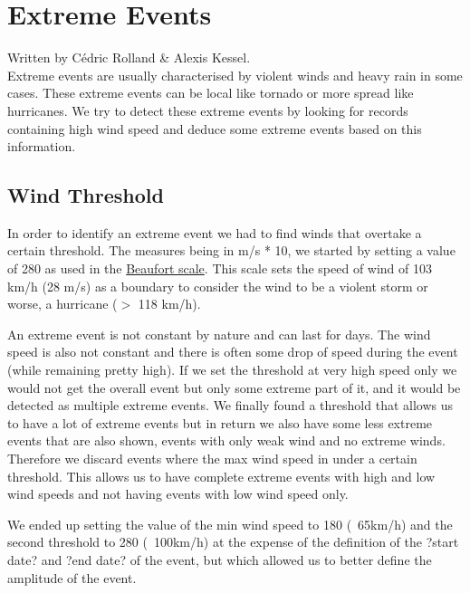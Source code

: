 \section{Extreme Events}
Written by Cédric Rolland \& Alexis Kessel.\\

Extreme events are usually characterised by violent winds and heavy rain in some cases. These extreme events can be local like tornado or more spread like hurricanes. We try to detect these extreme events by looking for records containing high wind speed and deduce some extreme events based on this information.

\subsection{Wind Threshold}
In order to identify an extreme event we had to find winds that overtake a certain threshold. The measures being in m/s * 10, we started by setting a value of 280 as used in the \href{http://en.wikipedia.org/wiki/Beaufort_scale}{Beaufort scale}. This scale sets the speed of wind of 103 km/h (28 m/s) as a boundary to consider the wind to be a violent storm or worse, a hurricane ($>$ 118 km/h).

An extreme event is not constant by nature and can last for days. The wind speed is also not constant and there is often some drop of speed during the event (while remaining pretty high). If we set the threshold at very high speed only we would not get the overall event but only some extreme part of it, and it would be detected as multiple extreme events. We finally found a threshold that allows us to have a lot of extreme events but in return we also have some less extreme events that are also shown, events with only weak wind and no extreme winds. Therefore we discard events where the max wind speed in under a certain threshold. This allows us to have complete extreme events with high and low wind speeds and not having events with low wind speed only.

We ended up setting the value of the min wind speed to 180 (~65km/h) and the second threshold to 280 (~100km/h) at the expense of the definition of the ?start date? and ?end date? of the event, but which allowed us to better define the amplitude of the event.

